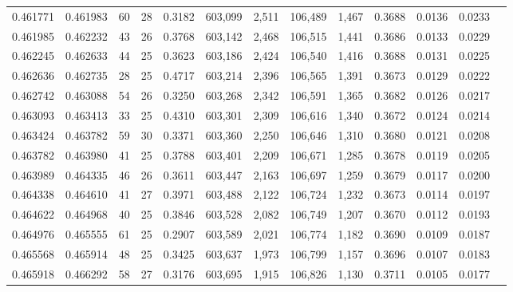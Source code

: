 \begin{tabular}{rrrrrrrrrrrrr}
0.461771 & 0.461983 &    60 &  28 &                                     0.3182 & 603,099 &   2,511 & 106,489 &   1,467 & 0.3688 & 0.0136 & 0.0233 \\
0.461985 & 0.462232 &    43 &  26 &                                     0.3768 & 603,142 &   2,468 & 106,515 &   1,441 & 0.3686 & 0.0133 & 0.0229 \\
0.462245 & 0.462633 &    44 &  25 &                                     0.3623 & 603,186 &   2,424 & 106,540 &   1,416 & 0.3688 & 0.0131 & 0.0225 \\
0.462636 & 0.462735 &    28 &  25 &                                     0.4717 & 603,214 &   2,396 & 106,565 &   1,391 & 0.3673 & 0.0129 & 0.0222 \\
0.462742 & 0.463088 &    54 &  26 &                                     0.3250 & 603,268 &   2,342 & 106,591 &   1,365 & 0.3682 & 0.0126 & 0.0217 \\
0.463093 & 0.463413 &    33 &  25 &                                     0.4310 & 603,301 &   2,309 & 106,616 &   1,340 & 0.3672 & 0.0124 & 0.0214 \\
0.463424 & 0.463782 &    59 &  30 &                                     0.3371 & 603,360 &   2,250 & 106,646 &   1,310 & 0.3680 & 0.0121 & 0.0208 \\
0.463782 & 0.463980 &    41 &  25 &                                     0.3788 & 603,401 &   2,209 & 106,671 &   1,285 & 0.3678 & 0.0119 & 0.0205 \\
0.463989 & 0.464335 &    46 &  26 &                                     0.3611 & 603,447 &   2,163 & 106,697 &   1,259 & 0.3679 & 0.0117 & 0.0200 \\
0.464338 & 0.464610 &    41 &  27 &                                     0.3971 & 603,488 &   2,122 & 106,724 &   1,232 & 0.3673 & 0.0114 & 0.0197 \\
0.464622 & 0.464968 &    40 &  25 &                                     0.3846 & 603,528 &   2,082 & 106,749 &   1,207 & 0.3670 & 0.0112 & 0.0193 \\
0.464976 & 0.465555 &    61 &  25 &                                     0.2907 & 603,589 &   2,021 & 106,774 &   1,182 & 0.3690 & 0.0109 & 0.0187 \\
0.465568 & 0.465914 &    48 &  25 &                                     0.3425 & 603,637 &   1,973 & 106,799 &   1,157 & 0.3696 & 0.0107 & 0.0183 \\
0.465918 & 0.466292 &    58 &  27 &                                     0.3176 & 603,695 &   1,915 & 106,826 &   1,130 & 0.3711 & 0.0105 & 0.0177 \\

\end{tabular}
